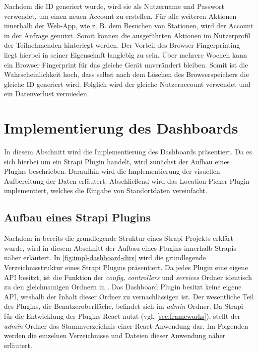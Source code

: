Nachdem die ID generiert wurde, wird sie als Nutzername und Passwort verwendet,
um einen neuen Account zu erstellen. Für alle weiteren Aktionen innerhalb der
Web-App, wie z. B. dem Besuchen von Stationen, wird der Account in der Anfrage
genutzt. Somit können die ausgeführten Aktionen im Nutzerprofil der
Teilnehmenden hinterlegt werden. Der Vorteil des Browser Fingerprinting liegt
hierbei in seiner Eigenschaft langlebig zu sein. Über mehrere Wochen kann
ein Browser Fingerprint für das gleiche Gerät unverändert bleiben. Somit ist die
Wahrscheinlichkeit hoch, dass selbst nach dem Löschen des Browserspeichers die
gleiche ID generiert wird. Folglich wird der gleiche Nutzeraccount verwendet und
ein Datenverlust vermieden.

\section{Implementierung des Dashboards} \label{sec:impl-dashboard}

In diesem Abschnitt wird die Implementierung des Dashboards präsentiert. Da es
sich hierbei um ein Strapi Plugin handelt, wird zunächst der Aufbau eines
Plugins beschrieben. Daraufhin wird die Implementierung der visuellen
Aufbereitung der Daten erläutert. Abschließend wird das Location-Picker Plugin
implementiert, welches die Eingabe von Standortdaten vereinfacht.

\subsection{Aufbau eines Strapi Plugins}

Nachdem in  bereits die grundlegende
Struktur eines Strapi Projekts erklärt wurde, wird in diesem Abschnitt der
Aufbau eines Plugins innerhalb Strapis näher erläutert. In
\autoref{fig:impl-dashboard-dirs} wird die grundlegende Verzeichnisstruktur
eines Strapi Plugins präsentiert. Da jedes Plugin eine eigene API besitzt, ist
die Funktion der \textit{config, controllers} und \textit{services} Ordner
identisch zu den gleichnamigen Ordnern in .
Das Dashboard Plugin besitzt keine eigene API, weshalb der Inhalt dieser Ordner
zu vernachlässigen ist. Der wesentliche Teil des Plugins, die
Benutzeroberfläche, befindet sich im \textit{admin} Ordner. Da Strapi für die
Entwicklung der Plugins React nutzt (vgl. \autoref{sec:frameworks}), stellt der
\textit{admin} Ordner das Stammverzeichnis einer React-Anwendung dar. Im
Folgenden werden die einzelnen Verzeichnisse und Dateien dieser Anwendung näher erläutert.

